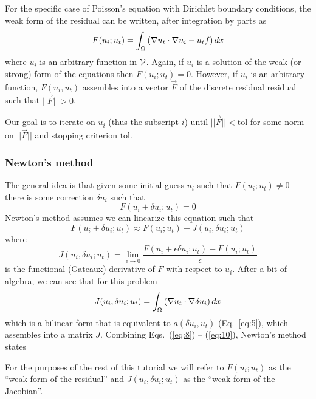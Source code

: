 For the specific case of Poisson's equation with Dirichlet boundary conditions,
the weak form of the residual can be written, after integration by
parts as
\begin{equation}
  \label{eq:4}
  F(u_{i};u_{t}) = \int_{\Omega}
  \left(
    \nabla u_{t}\cdot\nabla u_{i} - u_{t}f
  \right)dx
\end{equation}
where $u_{i}$ is an arbitrary function in $\mathcal{V}$.   Again, if
$u_{i}$ is a solution of the weak (or strong) form of the equations
then $F(u_{i};u_{t})=0$.  However, if  $u_{i}$ is an arbitrary
function, $F(u_{i},u_{t})$ assembles into a vector $\vec{F}$ of the
discrete residual residual such that $||\vec{F}||>0$.  

Our goal is to iterate on $u_{i}$ (thus the subscript
$i$) until $||\vec{F}||<\mathrm{tol}$ for some norm on $||\vec{F}||$ and stopping
criterion $\mathrm{tol}$.

\subsubsection{Newton's method}
\label{sec:newtons-method}

The general idea is that given some initial guess $u_{i}$ such that
$F(u_{i}; u_{t}) \neq 0$ there is some correction $\delta u_{i}$ such
that
\begin{equation}
  \label{eq:8}
  F(u_{i} + \delta u_{i}; u_{t}) = 0
\end{equation}
Newton's method assumes we can linearize this equation such that
\begin{equation}
  \label{eq:9}
   F(u_{i} + \delta u_{i}; u_{t}) \approx F(u_{i};u_{t}) +
   J(u_{i},\delta u_{i}; u_{t})
\end{equation}
where 
\begin{equation}
  \label{eq:10}
  J(u_{i},\delta u_{i}; u_{t}) = \lim_{\epsilon\rightarrow 0}
  \frac{F(u_{i}+\epsilon\delta u_{i};u_{t}) - F(u_{i};u_{t})}{\epsilon}
\end{equation}
is the functional (Gateaux) derivative of $F$ with respect to
$u_{i}$.  After a bit of algebra, we can see that for this problem
\begin{equation}
  \label{eq:11}
  J(u_{i},\delta u_{i}; u_{t}) = \int_{\Omega} \left(
    \nabla u_{t}\cdot\nabla \delta u_{i} \right)dx
\end{equation}
which is a bilinear form that is equivalent to $a(\delta u_{i},u_{t})$
(Eq.\ \ref{eq:5}), which assembles into a matrix $J$. Combining Eqs.\
(\ref{eq:8}) -- (\ref{eq:10}), Newton's method
states
\begin{quote}
\end{quote}
For the purposes of the rest of this tutorial we will refer to
$F(u_{i};u_{t})$ as the ``weak form of the residual'' and
$J(u_{i},\delta u_{i};u_{t})$ as the ``weak form of the Jacobian''.

